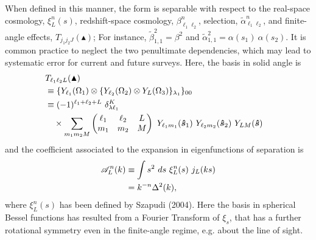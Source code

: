 \documentclass[useAMS,usenatbib]{mn2e}
\newcommand{\Del}{\ensuremath{\Delta}}
\newcommand{\tj}[6]{ \begin{pmatrix}
   #1 & #2 & #3 \\
   #4 & #5 & #6 
  \end{pmatrix}}
\begin{document}
When defined in this manner, the form is separable with respect to the real-space cosmology, $\xi^{n}_L(s)$, redshift-space cosmology, $\beta^{n}_{\ell_1 \ell_2}$, selection, $\tilde \alpha^{n}_{\ell_1 \ell_2}$, and finite-angle effects, $T_{j_1 j_2 J}(\blacktriangle)$;  For instance, $\tilde \beta^2_{1, 1} = \beta^2$ and $\tilde \alpha^2_{1,1} = \alpha(s_1) \ \alpha(s_2)$.  It is common practice to neglect the two penultimate dependencies, which may lead to systematic error for current and future surveys.  Here, the basis in solid angle is 
\begin{align}
&T_{\ell_1 \ell_2 L}(\blacktriangle) \notag \\ 
&\equiv 
\{ Y_{\ell_1} (\Omega_1) \otimes \{ Y_{\ell_2} (\Omega_2) \otimes Y_{L} (\Omega_3)\}_{\lambda_1} \}_{00}
& \notag \\
&\equiv (-1)^{\ell_1 + \ell_2 + L} \ \delta^{K}_{\lambda \ell_1} \notag \\ 
& \quad \times \sum_{m_1 m_2 M} \tj{\ell_1} {\ell_2}{L}{m_1}{m_2}{M} 
\ Y_{\ell_1 m_1}(\boldsymbol {\hat s}_1)
\ Y_{\ell_2 m_2}(\boldsymbol {\hat s}_2)
\ Y_{L M}(\boldsymbol {\hat s})
\end{align}
and the coefficient associated to the expansion in eigenfunctions of separation is 
\begin{align}
\mathcal{A}^{n}_L(k) &\equiv \int s^2 \ ds \ \xi^{n}_L(s) \ j_L(ks) \notag \\ &= k^{-n} \Del^2(k),
\end{align}
where $\xi^n_L(s)$ has been defined by Szapudi (2004).  Here the basis in spherical Bessel functions has resulted from a Fourier Transform of $\xi_s$, that has a further rotational symmetry even in the finite-angle regime, e.g.  about the line of sight.   
\end{document}

